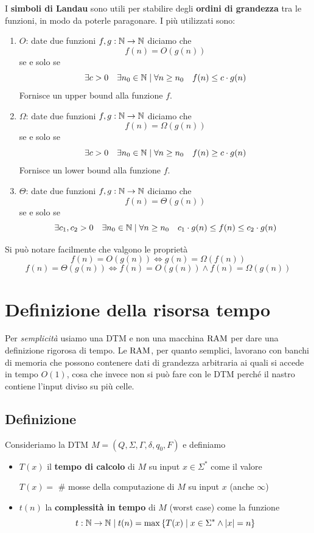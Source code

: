 I \textbf{simboli di Landau} sono utili per stabilire degli \textbf{ordini di grandezza} tra le funzioni, in modo da poterle paragonare. I più utilizzati sono:
\begin{enumerate}
	\item $O$: date due funzioni $f,g: \mathbb{N} \rightarrow \mathbb{N}$ diciamo che 
	$$ f(n) = O(g(n)) $$
	se e solo se
	$$ \exists c > 0 \quad \exists n_0 \in \mathbb{N} \mid \forall n \geq n_0 \quad f(n) \leq c \cdot g (n) $$
	Fornisce un upper bound alla funzione $f$.
	
	\item $\Omega$: date due funzioni $f,g: \mathbb{N} \rightarrow \mathbb{N}$ diciamo che 
	$$ f(n) = \Omega (g(n)) $$
	se e solo se
	$$ \exists c > 0 \quad \exists n_0 \in \mathbb{N} \mid \forall n \geq n_0 \quad f(n) \geq c \cdot g (n) $$
	Fornisce un lower bound alla funzione $f$.
	
	\item $\Theta$: date due funzioni $f,g : \mathbb{N} \rightarrow \mathbb{N}$ diciamo che
	$$ f(n) = \Theta (g(n)) $$
	se e solo se
	$$ \exists c_1, c_2 > 0 \quad \exists n_0 \in \mathbb{N} \mid \forall n \geq n_0 \quad c_1 \cdot g(n) \leq f(n) \leq c_2 \cdot g(n) $$
\end{enumerate}

Si può notare facilmente che valgono le proprietà
$$ f(n) = O(g(n)) \Leftrightarrow g(n) = \Omega(f(n)) $$
$$ f(n) = \Theta(g(n)) \Leftrightarrow f(n) = O (g(n)) \wedge f(n) = \Omega(g(n)) $$

\section{Definizione della risorsa tempo}

Per \textit{semplicità} usiamo una DTM e non una macchina $\text{RAM}$ per dare una definizione rigorosa di tempo. Le $\text{RAM}$, per quanto semplici, lavorano con banchi di memoria che possono contenere dati di grandezza arbitraria ai quali si accede in tempo $O(1)$, cosa che invece non si può fare con le DTM perché il nastro contiene l'input diviso su più celle.

\subsection{Definizione}

Consideriamo la DTM $M = (Q, \Sigma, \Gamma, \delta, q_0, F)$ e definiamo
\begin{itemize}
	\item $T(x)$ il \textbf{tempo di calcolo} di $M$ su input $x \in \Sigma^\ast$ come il valore
	\begin{center}
		$T(x) = $ \# mosse della computazione di $M$ su input $x$ (anche $\infty$)
	\end{center}
    
	\item $t(n)$ la \textbf{complessità in tempo} di $M$ (worst case) come la funzione
	$$ t: \mathbb{N} \rightarrow \mathbb{N} \mid t(n) = \max \left\{T(x) \mid x \in \Sigma^\ast \wedge |x| = n \right\} $$
\end{itemize}

